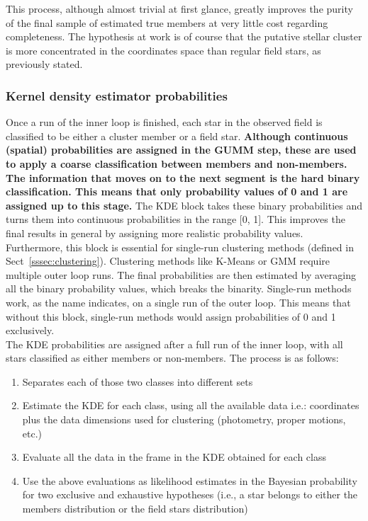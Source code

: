 \documentclass{aa}
\begin{document}
 This process, although almost trivial at first glance, greatly improves the
 purity of the final sample of estimated true members at very little cost
 regarding completeness. The hypothesis at work is of course that the putative
 stellar cluster is more concentrated in the coordinates space than regular
 field stars, as previously stated.



\subsubsection{Kernel density estimator probabilities}
 \label{sssec:kde-probs}

 Once a run of the inner loop is finished, each star in the observed field is
 classified to be either a cluster member or a field star. 
 \textbf{Although continuous (spatial) probabilities are assigned in the GUMM
 step, these are used to apply a coarse classification between members and
 non-members. The information that moves on to the next segment is the hard
 binary classification. This means that only probability values of 0 and 1 are
 assigned up to this stage.}
 The KDE block takes these binary probabilities and turns them into
 continuous probabilities in the range [0, 1]. This improves the final results
 in general by assigning more realistic probability values. Furthermore, this
 block is essential for single-run clustering methods (defined in
 Sect~\ref{sssec:clustering}). Clustering methods like K-Means or GMM
 require multiple outer loop runs. The final probabilities are then estimated
 by averaging all the binary probability values, which breaks the binarity.
 Single-run methods work, as the name indicates, on a single run of the outer
 loop. This means that without this block, single-run methods would assign
 probabilities of 0 and 1 exclusively.\\

 The KDE probabilities are assigned after a full run of the inner loop, with
 all stars classified as either members or non-members. The process is as
 follows:

 \begin{enumerate}
  \item Separates each of those two classes into different sets
  \item Estimate the KDE for each class, using all the available data i.e.:
  coordinates plus the data dimensions used for clustering (photometry, proper
  motions, etc.)
  \item Evaluate all the data in the frame in the KDE obtained for each class
  \item Use the above evaluations as likelihood estimates in the Bayesian
  probability for two exclusive and exhaustive hypotheses (i.e., a star
  belongs to either the members distribution or the field stars distribution)
 \end{enumerate}
\end{document}
